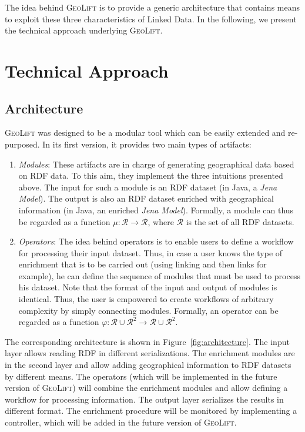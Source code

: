 \documentclass[a4paper,twoside,bibtotoc,abstracton,12pt,BCOR=15mm]{article}
\newcommand{\geolift}{\textsc{GeoLift}\xspace}
\begin{document}
The idea behind \geolift is to provide a generic architecture that contains means to exploit these three characteristics of Linked Data. 
In the following, we present the technical approach underlying \geolift.

\section{Technical Approach}
\subsection{Architecture}
\geolift was designed to be a modular tool which can be easily extended and re-purposed.
In its first version, it provides two main types of artifacts:
\begin{enumerate}
\item \emph{Modules}: These artifacts are in charge of generating geographical data based on RDF data. 
To this aim, they implement the three intuitions presented above.
The input for such a module is an RDF dataset (in Java, a \emph{Jena Model}).
The output is also an RDF dataset enriched with geographical information (in Java, an enriched \emph{Jena Model}).
Formally, a module can thus be regarded as a function $\mu: \mathcal{R} \rightarrow \mathcal{R}$, where $\mathcal{R}$ is the set of all RDF datasets.
\item \emph{Operators}: The idea behind operators is to enable users to define a workflow for processing their input dataset. 
Thus, in case a user knows the type of enrichment that is to be carried out (using linking and then links for example), he can define the sequence of modules that must be used to process his dataset.
Note that the format of the input and output of modules is identical. 
Thus, the user is empowered to create workflows of arbitrary complexity by simply connecting modules.
Formally, an operator can be regarded as a function $\varphi: \mathcal{R} \cup \mathcal{R}^2 \rightarrow \mathcal{R} \cup \mathcal{R}^2$.
\end{enumerate}
The corresponding architecture is shown in Figure~\ref{fig:architecture}. The input layer allows reading RDF in different serializations.
The enrichment modules are in the second layer and allow adding geographical information to RDF datasets by different means.
The operators (which will be implemented in the future version of \geolift) will combine the enrichment modules and allow defining a workflow for processing information.
The output layer serializes the results in different format.
The enrichment procedure will be monitored by implementing a controller, which will be added in the future version of \geolift.
\end{document}
